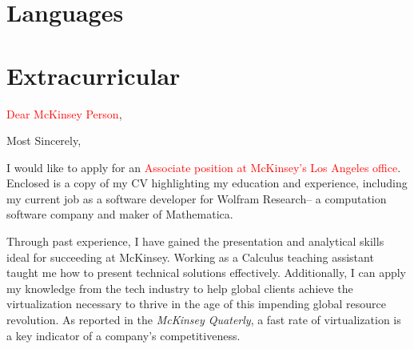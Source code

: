 \documentclass[11pt,a4paper,unicode]{moderncv}
\begin{document}

\section{Languages}





\section{Extracurricular}


\iffalse
\clearpage

\date{\today} %
\opening{\textcolor{red}{Dear McKinsey Person},} %
\closing{Most Sincerely,} %

\makelettertitle %
	I would like to apply for an \textcolor{red}{Associate position at McKinsey's Los Angeles office}. Enclosed is a copy of my CV highlighting my education and experience, including my current job as a software developer for Wolfram Research-- a computation software company and maker of Mathematica. 
		
\vspace{3mm}  
Through past experience, I have gained the presentation and analytical skills ideal for succeeding at McKinsey. Working as a Calculus teaching assistant taught me how to present technical solutions effectively. Additionally, I can apply my knowledge from the tech industry to help global clients achieve the virtualization necessary to thrive in the age of this impending global resource revolution. As reported in the \emph{McKinsey Quaterly}, a fast rate of virtualization is a key indicator of a company's competitiveness. 
\end{document}
